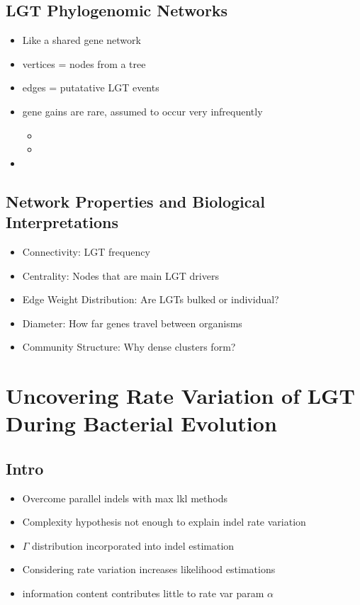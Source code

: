 \documentclass[10pt,letter]{article}
\begin{document}
\subsection*{LGT Phylogenomic Networks}
\begin{itemize}
    \item Like a shared gene network
    \item vertices = nodes from a tree
    \item edges = putatative LGT events
    \item gene gains are rare, assumed to occur very infrequently
    \begin{itemize}
        \item
        \item
    \end{itemize}
    \item
\end{itemize}
\subsection*{Network Properties and Biological Interpretations}
\begin{itemize}
    \item Connectivity: LGT frequency
    \item Centrality: Nodes that are main LGT drivers
    \item Edge Weight Distribution: Are LGTs bulked or individual?
    \item Diameter: How far genes travel between organisms
    \item Community Structure: Why dense clusters form?
\end{itemize}
\section*{Uncovering Rate Variation of LGT During Bacterial Evolution\cite{unrate}}
\subsection*{Intro}
\begin{itemize}
    \item Overcome parallel indels with max lkl methods
    \item Complexity hypothesis not enough to explain indel rate variation
    \item $\Gamma$ distribution incorporated into indel estimation
    \item Considering rate variation increases likelihood estimations
    \item information content contributes little to rate var param $\alpha$
\end{itemize}
\end{document}
